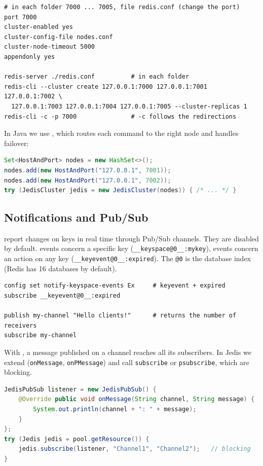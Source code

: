 \begin{lstlisting}
# in each folder 7000 ... 7005, file redis.conf (change the port)
port 7000
cluster-enabled yes
cluster-config-file nodes.conf
cluster-node-timeout 5000
appendonly yes

redis-server ./redis.conf          # in each folder
redis-cli --cluster create 127.0.0.1:7000 127.0.0.1:7001 127.0.0.1:7002 \
  127.0.0.1:7003 127.0.0.1:7004 127.0.0.1:7005 --cluster-replicas 1
redis-cli -c -p 7000               # -c follows the redirections
\end{lstlisting}
In Java we use , which routes each command to the right node and handles failover:
\begin{lstlisting}[language=Java]
Set<HostAndPort> nodes = new HashSet<>();
nodes.add(new HostAndPort("127.0.0.1", 7001));
nodes.add(new HostAndPort("127.0.0.1", 7002));
try (JedisCluster jedis = new JedisCluster(nodes)) { /* ... */ }
\end{lstlisting}

\subsection{Notifications and Pub/Sub}
 report changes on keys in real time through Pub/Sub channels. They are disabled by default.  events concern a specific key (\texttt{\_\_keyspace@0\_\_:mykey}),  events concern an action on any key (\texttt{\_\_keyevent@0\_\_:expired}). The \texttt{@0} is the database index (Redis has 16 databases by default).
\begin{lstlisting}
config set notify-keyspace-events Ex     # keyevent + expired
subscribe __keyevent@0__:expired

publish my-channel "Hello clients!"      # returns the number of receivers
subscribe my-channel
\end{lstlisting}
With , a message published on a channel reaches all its subscribers. In Jedis we extend  (\texttt{onMessage}, \texttt{onPMessage}) and call \texttt{subscribe} or \texttt{psubscribe}, which are blocking.
\begin{lstlisting}[language=Java]
JedisPubSub listener = new JedisPubSub() {
    @Override public void onMessage(String channel, String message) {
        System.out.println(channel + ": " + message);
    }
};
try (Jedis jedis = pool.getResource()) {
    jedis.subscribe(listener, "Channel1", "Channel2");   // blocking
}
\end{lstlisting}
